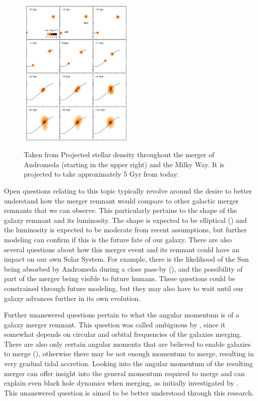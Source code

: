 \documentclass[twocolumn]{aastex631}
\begin{document}
\begin{figure}
    \centering
    \includegraphics[width = 0.5\textwidth]{Figure 2 from Cox (2008).png}
    \label{Figure 1}
    \caption{Taken from \cite{Cox_2008} Projected stellar density throughout the merger of Andromeda (starting in the upper right) and the Milky Way. It is projected to take approximately 5 Gyr from today. }
\end{figure}

Open questions relating to this topic typically revolve around the desire to better understand how the merger remnant would compare to other galactic merger remnants that we can observe. This particularly pertains to the shape of the galaxy remnant and its luminosity. The shape is expected to be elliptical (\cite{Cox_2008}) and the luminosity is expected to be moderate from recent assumptions, but further modeling can confirm if this is the future fate of our galaxy. There are also several questions about how this merger event and its remnant could have an impact on our own Solar System. For example, there is the likelihood of the Sun being absorbed by Andromeda during a close pass-by (\cite{Cox_2008}), and the possibility of part of the merger being visible to future humans. These questions could be constrained through future modeling, but they may also have to wait until our galaxy advances further in its own evolution. 

Further unanswered questions pertain to what the angular momentum is of a galaxy merger remnant. This question was called ambiguous by \cite{2008ApJS..175..356H}, since it somewhat depends on circular and orbital frequencies of the galaxies merging. There are also only certain angular momenta that are believed to enable galaxies to merge (\cite{2008ApJS..175..356H}), otherwise there may be not enough momentum to merge, resulting in very gradual tidal accretion. Looking into the angular momentum of the resulting merger can offer insight into the general momentum required to merge and can explain even black hole dynamics when merging, as initially investigated by \cite{2008ApJS..175..356H}. This unanswered question is aimed to be better understood through this research. 
\end{document}
